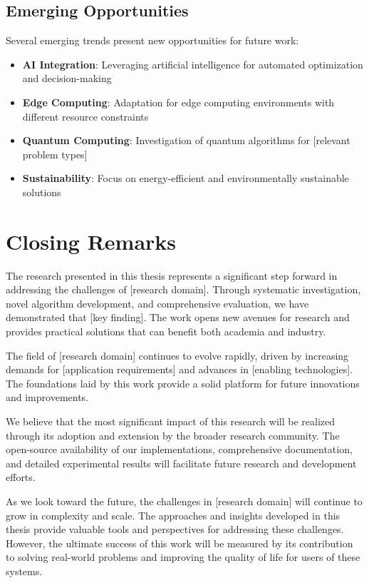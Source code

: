 \subsection{Emerging Opportunities}

Several emerging trends present new opportunities for future work:

\begin{itemize}
    \item \textbf{AI Integration}: Leveraging artificial intelligence for automated optimization and decision-making
    \item \textbf{Edge Computing}: Adaptation for edge computing environments with different resource constraints
    \item \textbf{Quantum Computing}: Investigation of quantum algorithms for [relevant problem types]
    \item \textbf{Sustainability}: Focus on energy-efficient and environmentally sustainable solutions
\end{itemize}

\section{Closing Remarks}

The research presented in this thesis represents a significant step forward in addressing the challenges of [research domain]. Through systematic investigation, novel algorithm development, and comprehensive evaluation, we have demonstrated that [key finding]. The work opens new avenues for research and provides practical solutions that can benefit both academia and industry.

The field of [research domain] continues to evolve rapidly, driven by increasing demands for [application requirements] and advances in [enabling technologies]. The foundations laid by this work provide a solid platform for future innovations and improvements.

We believe that the most significant impact of this research will be realized through its adoption and extension by the broader research community. The open-source availability of our implementations, comprehensive documentation, and detailed experimental results will facilitate future research and development efforts.

As we look toward the future, the challenges in [research domain] will continue to grow in complexity and scale. The approaches and insights developed in this thesis provide valuable tools and perspectives for addressing these challenges. However, the ultimate success of this work will be measured by its contribution to solving real-world problems and improving the quality of life for users of these systems.

